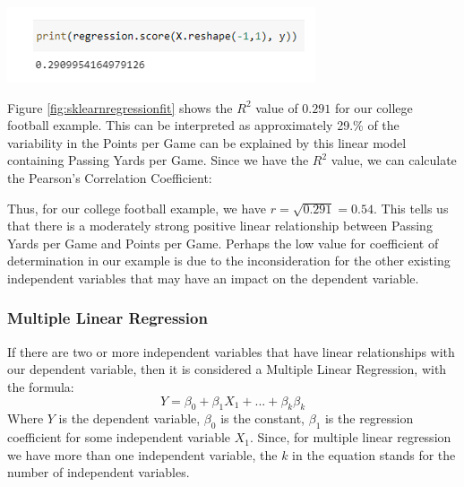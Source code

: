 \documentclass[a4paper,12pt]{report}
\begin{document}
\begin{center}
    \captionsetup{type=figure}
    \includegraphics[width=.9\linewidth]{media/printregression.png}
\end{center}

Figure \ref{fig:sklearnregressionfit} shows the $R^2$ value of $0.291$ for our college football example. This can be interpreted as approximately 29.\% of the variability in the Points per Game can be explained by this linear model containing Passing Yards per Game. Since we have the $R^2$ value, we can calculate the Pearson’s Correlation Coefficient:


Thus, for our college football example, we have $r=\sqrt{0.291}=0.54$. This tells us that there is a moderately strong positive linear relationship between Passing Yards per Game and Points per Game. Perhaps the low value for coefficient of determination in our example is due to the inconsideration for the other existing independent variables that may have an impact on the dependent variable. 


\subsubsection{Multiple Linear Regression}
If there are two or more independent variables that have linear relationships with our dependent variable, then it is considered a Multiple Linear Regression, with the formula:
$$Y=\beta_0+\beta_1X_1+...+\beta_k\beta_k$$
Where $Y$ is the dependent variable, $\beta_0$ is the constant, $\beta_1$ is the regression coefficient for some independent variable $X_1$. Since, for multiple linear regression we have more than one independent variable, the $k$ in the equation stands for the number of independent variables.
\end{document}
